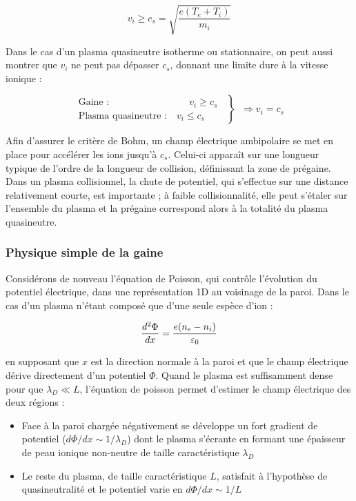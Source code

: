 \begin{refsection}
\begin{equation}
v_i\ge c_s=\sqrt{\frac{e (T_{e}+T_{i})}{m_{i}}}
\end{equation}

Dans le cas d'un plasma quasineutre isotherme ou stationnaire, on peut aussi
montrer que $v_i$ ne peut pas dépasser $c_s$, donnant une limite
dure à la vitesse ionique :

\begin{equation}
\left.\begin{aligned}
\text{Gaine :~~~~~~~~~~~~~~~~~~~~~~~~~}v_i\ge c_s\\
\text{Plasma quasineutre :~~~}v_i\le c_s
\end{aligned}
\;\;\right\}\;\;\Rightarrow v_i=c_s
\end{equation}


Afin d'assurer le critère de Bohm, un champ électrique ambipolaire
se met en place pour accélérer les ions jusqu'à $c_s$. Celui-ci apparaît sur une
longueur typique de l'ordre de la longueur de collision,
définissant la zone de prégaine.
Dans un plasma collisionnel, la chute de potentiel, qui s'effectue sur une
distance relativement courte, est importante ; à faible collisionnalité, elle
peut s'étaler sur l'ensemble du plasma et la prégaine correspond alors à
la totalité du plasma quasineutre.


\subsubsection{Physique simple de la gaine}
\label{1-gaine}
Considérons de nouveau l'équation de Poisson, qui contrôle l'évolution du
potentiel électrique, dans une représentation 1D au voisinage de la paroi. Dans
le cas d'un plasma n'étant composé que d'une seule espèce d'ion  :

\begin{equation}
\frac{d^{{2}}\Phi}{dx}=\frac{e(n_{e}-n_{i})}{\varepsilon{_{0}}}
\end{equation}

 en supposant que $x$ est la
 direction normale à la paroi et que le champ électrique dérive directement
 d'un potentiel $\Phi$.
 Quand le plasma est suffisamment dense pour que $\lambda_D\ll L$, l'équation de poisson permet
 d'estimer le champ électrique des deux régions :

 \begin{itemize}
   \item Face à la paroi chargée négativement se
   développe un fort gradient de potentiel ($d\Phi/dx\sim 1/\lambda_D$) dont le plasma
   s'écrante en formant une épaisseur de peau ionique non-neutre de
   taille caractéristique $\lambda_D$
   \item Le reste du plasma, de taille caractéristique $L$, satisfait
   à l'hypothèse de quasineutralité et le potentiel varie en
   $d\Phi/dx\sim1/L$
 \end{itemize}


\end{refsection}
